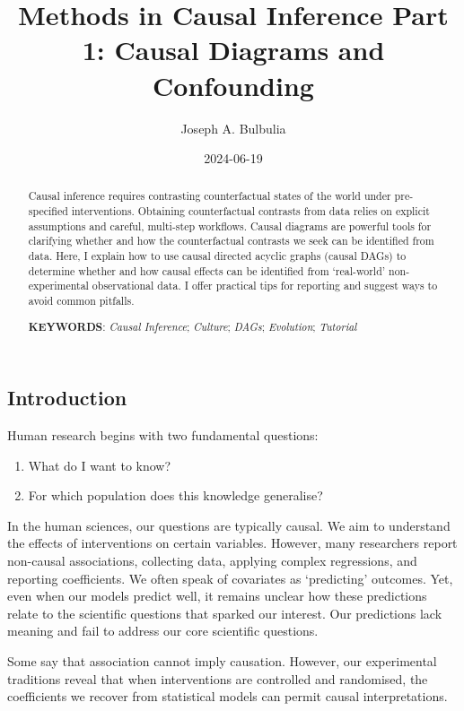 \documentclass[
  single column]{article}
\title{Methods in Causal Inference Part 1: Causal Diagrams and
Confounding}
\author{Joseph A. Bulbulia}
\affil{%
             \small{     Victoria University of Wellington, NEW ZEALAND
          ORCID \textcolor[HTML]{A6CE39}{\aiOrcid} ~0000-0002-5861-2056 }
              }
\date{2024-06-19}
\providecommand{\tightlist}{%
  \setlength{\itemsep}{0pt}\setlength{\parskip}{0pt}}\usepackage{longtable,booktabs,array}
\begin{document}
\maketitle
\begin{abstract}
Causal inference requires contrasting counterfactual states of the world
under pre-specified interventions. Obtaining counterfactual contrasts
from data relies on explicit assumptions and careful, multi-step
workflows. Causal diagrams are powerful tools for clarifying whether and
how the counterfactual contrasts we seek can be identified from data.
Here, I explain how to use causal directed acyclic graphs (causal DAGs)
to determine whether and how causal effects can be identified from
`real-world' non-experimental observational data. I offer practical tips
for reporting and suggest ways to avoid common pitfalls.

\textbf{KEYWORDS}: \emph{Causal Inference}; \emph{Culture}; \emph{DAGs};
\emph{Evolution}; \emph{Tutorial}
\end{abstract}

\subsection{Introduction}\label{id-sec-introduction}

Human research begins with two fundamental questions:

\begin{enumerate}
\def\labelenumi{\arabic{enumi}.}
\tightlist
\item
  What do I want to know?
\item
  For which population does this knowledge generalise?
\end{enumerate}

In the human sciences, our questions are typically causal. We aim to
understand the effects of interventions on certain variables. However,
many researchers report non-causal associations, collecting data,
applying complex regressions, and reporting coefficients. We often speak
of covariates as `predicting' outcomes. Yet, even when our models
predict well, it remains unclear how these predictions relate to the
scientific questions that sparked our interest. Our predictions lack
meaning and fail to address our core scientific questions.

Some say that association cannot imply causation. However, our
experimental traditions reveal that when interventions are controlled
and randomised, the coefficients we recover from statistical models can
permit causal interpretations.
\end{document}
